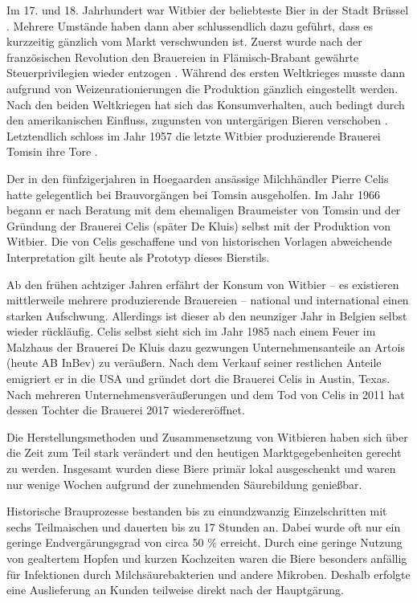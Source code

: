 \documentclass[a4paper,parskip=half]{scrartcl}
\begin{document}
Im 17. und 18. Jahrhundert war Witbier der beliebteste Bier
in der Stadt Brüssel \parencite{Zainasheff2007}.
Mehrere Umstände haben dann aber schlussendlich dazu geführt, dass
es kurzzeitig gänzlich vom Markt verschwunden ist.
Zuerst wurde nach der französischen Revolution den Brauereien in
Flämisch-Brabant gewährte Steuerprivilegien wieder entzogen
\parencite[44]{Roncoroni2018}. Während des ersten Weltkrieges
musste dann aufgrund von Weizenrationierungen die Produktion gänzlich
eingestellt werden. Nach den beiden Weltkriegen hat sich
das Konsumverhalten, auch bedingt durch den amerikanischen
Einfluss, zugunsten von untergärigen Bieren verschoben \parencite[4]{Strottner1999}. Letztendlich schloss im Jahr 1957 die letzte
Witbier produzierende Brauerei Tomsin ihre Tore \parencite[44]{Roncoroni2018}.

Der in den fünfzigerjahren in Hoegaarden ansässige Milchhändler Pierre
Celis hatte gelegentlich bei Brauvorgängen bei Tomsin ausgeholfen. Im
Jahr 1966 begann er nach Beratung mit dem ehemaligen
Braumeister von Tomsin und der Gründung der Brauerei Celis
(später De Kluis) selbst mit der Produktion von Witbier. Die von
Celis geschaffene und von historischen Vorlagen abweichende Interpretation
gilt heute als Prototyp dieses Bierstils.
\parencite[37,49]{Hieronymus2010} 

Ab den frühen achtziger Jahren erfährt der Konsum von Witbier -- es
existieren mittlerweile mehrere produzierende Brauereien -- national und
international einen starken Aufschwung. Allerdings ist dieser
ab den neunziger Jahr in Belgien selbst wieder rückläufig.
Celis selbst sieht sich im Jahr 1985 nach einem Feuer im Malzhaus der Brauerei
De Kluis dazu gezwungen Unternehmensanteile an Artois (heute
AB InBev) zu veräußern. Nach dem Verkauf seiner restlichen Anteile
emigriert er in die USA und gründet dort die Brauerei Celis in Austin,
Texas. Nach mehreren Unternehmensveräußerungen und dem Tod von Celis in 2011
hat dessen Tochter die Brauerei 2017 wiedereröffnet. \parencites[1]{Strottner1999}[37,49]{Hieronymus2010}{Meewes2017}

Die Herstellungsmethoden und Zusammensetzung von Witbieren haben
sich über die Zeit zum Teil stark verändert und den heutigen
Marktgegebenheiten gerecht zu werden. Insgesamt wurden diese
Biere primär lokal ausgeschenkt und waren nur wenige
Wochen aufgrund der zunehmenden Säurebildung genießbar.
\parencite[118]{Strottner1999}

Historische Brauprozesse bestanden bis zu einundzwanzig
Einzelschritten mit sechs Teilmaischen und dauerten bis zu
17 Stunden an. Dabei wurde oft nur ein geringe Endvergärungsgrad
von circa 50 \% erreicht. Durch eine geringe Nutzung von
gealtertem Hopfen und kurzen Kochzeiten waren die
Biere besonders anfällig für Infektionen durch
Milchsäurebakterien und andere Mikroben. Deshalb erfolgte
eine Auslieferung an Kunden teilweise direkt nach
der Hauptgärung.
\parencite[38--41]{Hieronymus2010}
\end{document}
